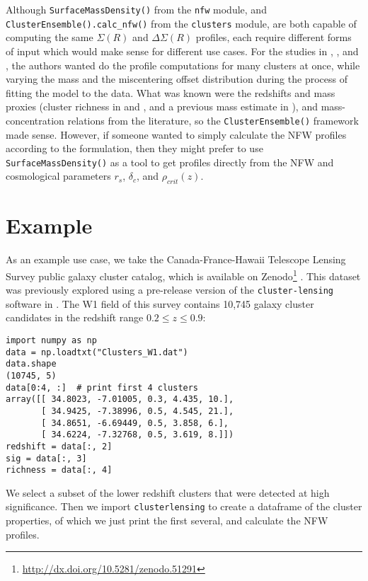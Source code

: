\documentclass[twocolumn]{aastex6}
\newcommand{\code}{\lstinline[style=codeintext]}
\begin{document}
Although \code{SurfaceMassDensity()} from the \code{nfw} module, and \code{ClusterEnsemble().calc_nfw()} from the \code{clusters} module, are both capable of computing the same $\Sigma(R)$ and $\Delta\Sigma(R)$ profiles, each require different forms of input which would make sense for different use cases. For the studies in \citet{Ford15}, \citet{Ford14}, and \citet{Ford12}, the authors wanted do the profile computations for many clusters at once, while varying the mass and the miscentering offset distribution during the process of fitting the model to the data. What was known were the redshifts and mass proxies (cluster richness in \citealt{Ford15} and \citealt{Ford14}, and a previous mass estimate in \citealt{Ford12}), and mass-concentration relations from the literature, so the \code{ClusterEnsemble()} framework made sense. However, if someone wanted to simply calculate the NFW profiles according to the \citet{Wright00} formulation, then they might prefer to use \code{SurfaceMassDensity()} as a tool to get profiles directly from the NFW and cosmological parameters $r_s$, $\delta_c$, and $\rho_{crit}(z)$.


\section{Example}
\label{ex}
As an example use case, we take the Canada-France-Hawaii Telescope Lensing Survey \citep[CFHTLenS;][]{Heymans12, Erben13} public galaxy cluster catalog, which is available on Zenodo\footnote{\url{http://dx.doi.org/10.5281/zenodo.51291}} \citep{3DMFcatalog}. This dataset was previously explored using a pre-release version of the \code{cluster-lensing} software in \citet{Ford14, Ford15}. The W1 field of this survey contains 10,745 galaxy cluster candidates in the redshift range $0.2 \le z \le 0.9$:

\begin{lstlisting}
import numpy as np
data = np.loadtxt("Clusters_W1.dat")
data.shape
(10745, 5)
data[0:4, :]  # print first 4 clusters
array([[ 34.8023, -7.01005, 0.3, 4.435, 10.],
       [ 34.9425, -7.38996, 0.5, 4.545, 21.],
       [ 34.8651, -6.69449, 0.5, 3.858, 6.],
       [ 34.6224, -7.32768, 0.5, 3.619, 8.]])
redshift = data[:, 2]
sig = data[:, 3]
richness = data[:, 4]
\end{lstlisting}

We select a subset of the lower redshift clusters that were detected at high significance. Then we import \code{clusterlensing} to create a dataframe of the cluster properties, of which we just print the first several, and calculate the NFW profiles.
\end{document}
